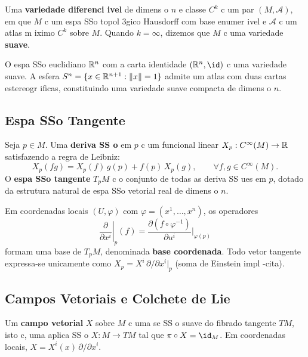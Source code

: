 \begin{defi}
Uma \textbf{variedade diferenci ivel} de dimens o $n$ e classe $C^k$ c um par $(M,\mathcal{A})$, em que $M$ c um espa SSo topol 3gico Hausdorff com base enumer ivel e $\mathcal{A}$ c um atlas m iximo $C^k$ sobre $M$. Quando $k=\infty$, dizemos que $M$ c uma variedade \textbf{suave}.
\end{defi}

\begin{ex}
O espa SSo euclidiano $\mathbb{R}^n$ com a carta identidade $(\R^n,\id)$ c uma variedade suave. A esfera $S^n = \{x\in\mathbb{R}^{n+1}:\|x\|=1\}$ admite um atlas com duas cartas estereogr ificas, constituindo uma variedade suave compacta de dimens o $n$.
\end{ex}

\subsection{Espa SSo Tangente}

\begin{defi}
Seja $p\in M$. Uma \textbf{deriva SS o} em $p$ c um funcional linear $X_p:C^\infty(M)\to\mathbb{R}$ satisfazendo a regra de Leibniz:
\begin{equation}
 X_p(fg) = X_p(f)\,g(p) + f(p)\,X_p(g),\qquad \forall f,g\in C^\infty(M).
\end{equation}
O \textbf{espa SSo tangente} $T_pM$ c o conjunto de todas as deriva SS ues em $p$, dotado da estrutura natural de espa SSo vetorial real de dimens o $n$.
\end{defi}

Em coordenadas locais $(U,\varphi)$ com $\varphi=(x^1,\dots,x^n)$, os operadores
\begin{equation}
 \left.\frac{\partial}{\partial x^i}\right|_p(f) = \frac{\partial (f\circ\varphi^{-1})}{\partial u^i}\Big|_{\varphi(p)}
\end{equation}
formam uma base de $T_pM$, denominada \textbf{base coordenada}. Todo vetor tangente expressa-se unicamente como $X_p = X^i\,\partial/\partial x^i|_p$ (soma de Einstein impl -cita).

\subsection{Campos Vetoriais e Colchete de Lie}

\begin{defi}
Um \textbf{campo vetorial} $X$ sobre $M$ c uma se SS o suave do fibrado tangente $TM$, isto c, uma aplica SS o $X:M\to TM$ tal que $\pi\circ X = \id_M$. Em coordenadas locais, $X = X^i(x)\,\partial/\partial x^i$.
\end{defi}

